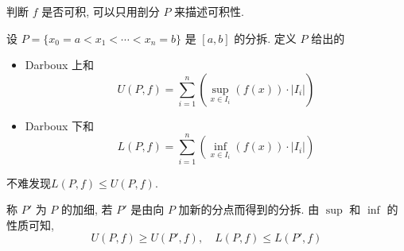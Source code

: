 判断 $f$ 是否可积, 可以只用剖分 $P$ 来描述可积性. 
\begin{definition}
  设 $P = \{ x_0 = a < x_1 < \cdots < x_{n} = b \}$ 是 $[a,b]$ 的分拆.
  定义 $P$ 给出的
  \begin{itemize}
    \item Darboux 上和
      \begin{equation}
        U \left( P , f \right) = \sum_{i=1}^{n} \left( \sup_{x \in I_{i}} \left( f(x) \right) \cdot |I_{i}| \right)
      \end{equation}
      
    \item Darboux 下和
      \begin{equation}
        L \left( P , f \right) = \sum_{i=1}^{n} \left( \inf_{x \in I_{i}} \left( f(x) \right) \cdot |I_{i}| \right)
      \end{equation}
  \end{itemize}
  不难发现$ L\left( P,f \right) \le U(P,f)$.
\end{definition}
称 $P'$ 为 $P$ 的加细, 若 $P'$ 是由向 $P$ 加新的分点而得到的分拆.
由 $\sup$ 和 $\inf$ 的性质可知, 
\begin{equation}
  U\left( P,f \right) \ge U(P',f) , \quad L \left( P, f \right) \le L \left( P', f \right)
\end{equation}

